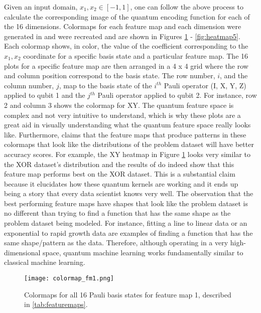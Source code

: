 \documentclass[
	a4paper, %
	10pt, %
	unnumberedsections, %
	twoside, %
]{LTJournalArticle}
\begin{document}
Given an input domain, $x_1, x_2 \in [-1, 1]$, one can follow the above process to calculate the corresponding image of the quantum encoding function for each of the 16 dimensions. Colormaps 
for each feature map and each dimension were generated in \autocite{suzuki2020analysis} and were recreated and are shown in Figures \ref{fig:heatmap1} - \ref{fig:heatmap5}. Each colormap shows, 
in color, the value of the coefficient corresponding to the $x_1, x_2$ coordinate for a specific basis state and a particular feature map. The 16 plots for a specific feature map are then arranged 
in a 4 x 4 grid where the row and column position correspond to the basis state. The row number, $i$, and the column number, $j$, map to the basis state of the $i^{th}$ Pauli operator ({I, X, Y, Z}) 
applied to qubit 1 and the $j^{th}$ Pauli operator applied to qubit 2. For instance, row 2 and column 3 shows the colormap for XY. The quantum feature space is complex and not very intuitive to 
understand, which is why these plots are a great aid in visually understanding what the quantum feature space really looks like. Furthermore, \autocite{suzuki2020analysis} claims that the feature 
maps that produce patterns in these colormaps that look like the distributions of the problem dataset will have better accuracy scores. For example, the XY heatmap in Figure \ref{fig:heatmap1} 
looks very similar to the XOR dataset's distribution and the results of \autocite{suzuki2020analysis} do indeed show that this feature map performs best on the XOR dataset. This is a substantial 
claim because it elucidates how these quantum kernels are working and it ends up being a story that every data scientist knows very well. The observation that the best performing feature maps 
have shapes that look like the problem dataset is no different than trying to find a function that has the same shape as the problem dataset being modeled. For instance, fitting a line to linear 
data or an exponential to rapid growth data are examples of finding a function that has the same shape/pattern as the data. Therefore, although operating in a very high-dimensional space, quantum 
machine learning works fundamentally similar to classical machine learning.

\begin{figure}
	\texttt{[image: colormap\_fm1.png]}
	\caption{Colormaps for all 16 Pauli basis states for feature map 1, described in \ref{tab:featuremaps}.}
	\label{fig:heatmap1}
\end{figure}
\end{document}
